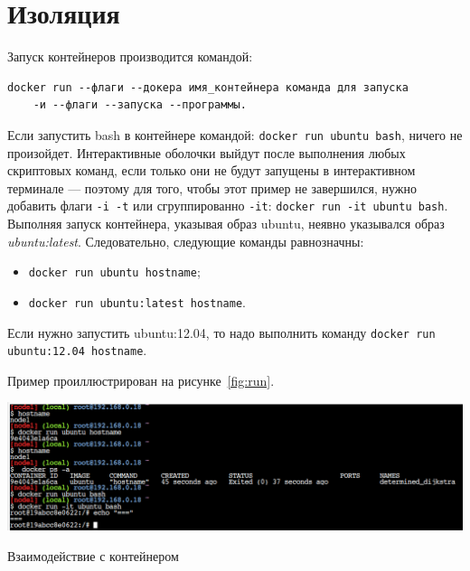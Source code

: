 \section{Изоляция}
Запуск контейнеров производится командой:

\begin{verbatim}
docker run --флаги --докера имя_контейнера команда для запуска
	-и --флаги --запуска --программы.
\end{verbatim}

Если запустить bash в контейнере командой: \texttt{docker~run~ubuntu~bash},
ничего не произойдет. Интерактивные оболочки выйдут после
выполнения любых скриптовых команд, если только они не будут
запущены в интерактивном терминале --- поэтому для того, чтобы этот пример
не завершился, нужно добавить флаги \texttt{-i~-t}
или сгруппированно \texttt{-it}: \texttt{docker~run~-it~ubuntu~bash}.
Выполняя запуск контейнера, указывая образ ubuntu,
неявно указывался образ \textit{ubuntu:latest}.
Следовательно, следующие команды равнозначны:

\begin{itemize}
	\item \texttt{docker run ubuntu hostname};
	\item \texttt{docker run ubuntu:latest hostname}.
\end{itemize}

Если нужно запустить ubuntu:12.04, то надо выполнить команду
\texttt{docker run ubuntu:12.04 hostname}.\par
Пример проиллюстрирован на рисунке~\ref{fig:run}.

\begin{image}
	\includegraphics[width=1\textwidth]{Screenshot from 2023-04-15 15-31-58}
	\caption{Взаимодействие с контейнером}
	\label{fig:run}
\end{image}

